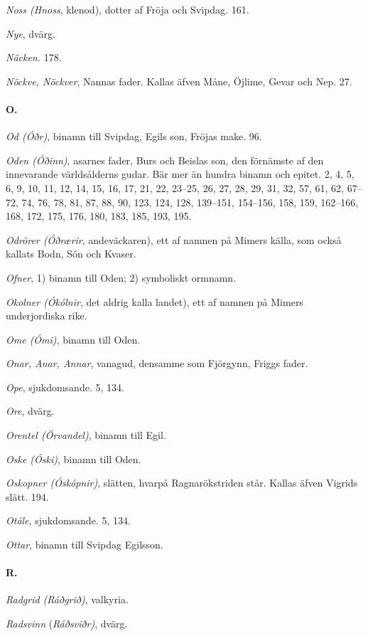\emph{Noss (Hnoss}, klenod), dotter af Fröja och Svipdag. 161.

\emph{Nye}, dvärg.

\emph{Näcken.} 178.

\emph{Nöckve, Nöckver}, Nannas fader. Kallas äfven Måne, Öjlime, Gevar
och Nep. 27.

\paragraph{O.}

\emph{Od (Óðr)}, binamn till Svipdag, Egils son, Fröjas make. 96.

\emph{Oden (Óðinn)}, asarnes fader, Burs och Beislas son, den förnämste
af den innevarande världsålderns gudar. Bär mer än hundra binamn och
epitet. 2, 4, 5, 6, 9, 10, 11, 12, 14, 15, 16, 17, 21, 22, 23--25, 26,
27, 28, 29, 31, 32, 57, 61, 62, 67--72, 74, 76, 78, 81, 87, 88, 90, 123,
124, 128, 139--151, 154--156, 158, 159, 162--166, 168, 172, 175, 176,
180, 183, 185, 193, 195.

\emph{Odrörer (Óðrærir}, andeväckaren), ett af namnen på Mimers källa,
som också kallats Bodn, Són och Kvaser.

\emph{Ofner}, 1) binamn till Oden; 2) symboliskt ormnamn.

\emph{Okolner (Ókólnir}, det aldrig kalla landet), ett af namnen på
Mimers underjordiska rike.

\emph{Ome (Ómi)}, binamn till Oden.

\emph{Onar, Anar, Annar}, vanagud, densamme som Fjörgynn, Friggs fader.

\emph{Ope}, sjukdomsande. 5, 134.

\emph{Ore}, dvärg.

\emph{Orentel (Örvandel)}, binamn till Egil.

\emph{Oske (Óski)}, binamn till Oden.

\emph{Oskopner (Óskópnir)}, slätten, hvarpå Ragnarökstriden står. Kallas
äfven Vigrids slätt. 194.

\emph{Otåle}, sjukdomsande. 5, 134.

\emph{Ottar}, binamn till Svipdag Egilsson.

\paragraph{R.}

\emph{Radgrid (Ráðgrið)}, valkyria.

\emph{Radsvinn} (\emph{Ráðsviðr)}, dvärg.

